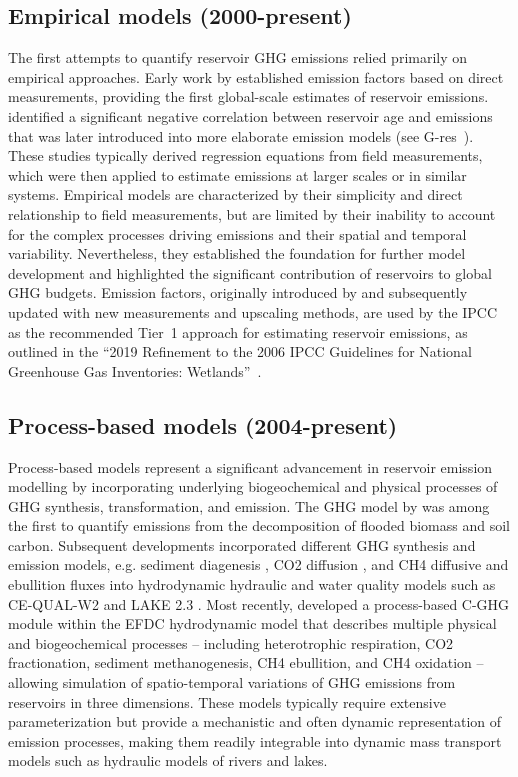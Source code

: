 \documentclass[final,1p,times]{elsarticle}
\begin{document}
\subsection{Empirical models (2000-present)}
\label{subsec:empirical_models}
The first attempts to quantify reservoir \ac{GHG} emissions relied primarily on empirical approaches. 
Early work by \citet{Louis2000} established emission factors based on direct measurements, providing the first global-scale estimates of reservoir emissions. 
\citet{Barros2011} identified a significant negative correlation between reservoir age and emissions that was later introduced into more elaborate emission models (see G-res~\cite{Prairie2017b, Prairie2021}).
These studies typically derived regression equations from field measurements, which were then applied to estimate emissions at larger scales or in similar systems.
Empirical models are characterized by their simplicity and direct relationship to field measurements, but are limited by their inability to account for the complex processes driving emissions and their spatial and temporal variability. 
Nevertheless, they established the foundation for further model development and highlighted the significant contribution of reservoirs to global \ac{GHG} budgets.
Emission factors, originally introduced by \citet{Louis2000} and subsequently updated with new measurements and upscaling methods, are used by the IPCC as the recommended Tier~1 approach for estimating reservoir emissions, as outlined in the ``2019 Refinement to the 2006 \acs{IPCC} Guidelines for National Greenhouse Gas Inventories: Wetlands''~\cite{IPCC2019}.

\subsection{Process-based models (2004-present)}
\label{sec:process_models}
Process-based models represent a significant advancement in reservoir emission modelling by incorporating underlying biogeochemical and physical processes of \ac{GHG} synthesis, transformation, and emission.
The \ac{GHG} model by \citet{Tremblay2004} was among the first to quantify emissions from the decomposition of flooded biomass and soil carbon.
Subsequent developments incorporated different \ac{GHG} synthesis and emission models, e.g. sediment diagenesis \cite{Berger2014}, \ac{CO2} diffusion \cite{Wu2022}, and \ac{CH4} diffusive and ebullition fluxes \citep{Lomov2024} into hydrodynamic hydraulic and water quality models such as CE-QUAL-W2 \citep{Berger2014, Wu2022} and LAKE 2.3 \citep{Lomov2024}.
Most recently, \citet{SHI2025} developed a process-based C-GHG module within the \ac{EFDC} hydrodynamic model \cite{hamrick1992} that describes multiple physical and biogeochemical processes -- including heterotrophic respiration, \ac{CO2} fractionation, sediment methanogenesis, \ac{CH4} ebullition, and \ac{CH4} oxidation -- allowing simulation of spatio-temporal variations of \ac{GHG} emissions from reservoirs in three dimensions.
These models typically require extensive parameterization but provide a mechanistic and often dynamic representation of emission processes, making them readily integrable into dynamic mass transport models such as hydraulic models of rivers and lakes.
\end{document}
